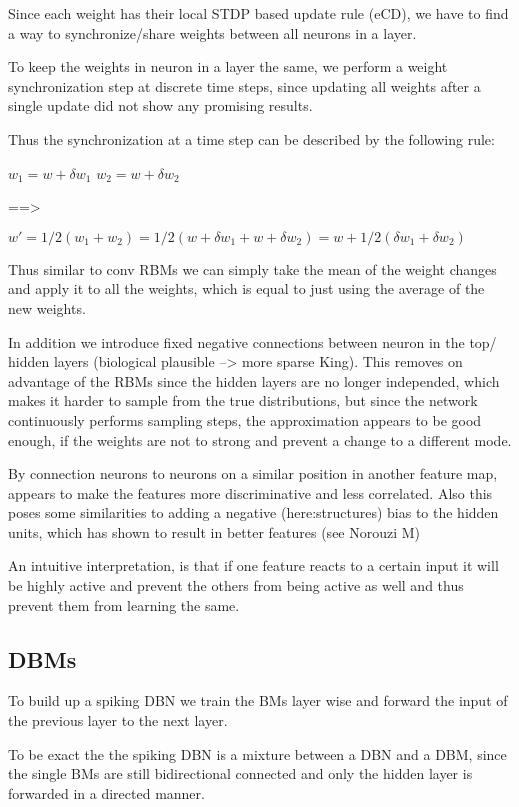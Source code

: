 Since each weight has their local STDP based update rule (eCD), we have to find a way to synchronize/share weights between all neurons in a layer.

To keep the weights in neuron in a layer the same, we perform a weight synchronization step at discrete time steps, since updating all weights after a single update did not show any promising results.

Thus the synchronization at a time step can be described by the following rule:  

$w_1 = w + \delta w_1 $
$w_2 = w + \delta w_2 $

==> 

$w' = 1/2 (w_1 + w_2 ) = 1/2 (w + \delta w_1 + w + \delta w_2) = w + 1/2 (\delta w_1 + \delta w_2)$

Thus similar to conv RBMs we can simply take the mean of the weight changes and apply it to all the weights, which is equal to just using the average of the new weights. 

In addition we introduce fixed negative connections between neuron in the top/ hidden layers (biological plausible --> more sparse King).
This removes on advantage of the RBMs since the hidden layers are no longer independed, which makes it harder to sample from the true distributions, but since the network continuously performs sampling steps, the approximation appears to be good enough, if the weights are not to strong and prevent a change to a different mode.

By connection neurons to neurons on a similar position in another feature map, appears to make the features more discriminative and less correlated.
Also this poses some similarities to adding a negative (here:structures) bias to the hidden units, which has shown to result in better features (see Norouzi M)

An intuitive interpretation, is that if one feature reacts to a certain input it will be highly active and prevent the others from being active as well and thus prevent them from learning the same.  

\subsection{DBMs}

To build up a spiking DBN we train the BMs layer wise and forward the input of the previous layer to the next layer.

To be exact the the spiking DBN is a mixture between a DBN and a DBM, since the single BMs are still bidirectional connected and only the hidden layer is forwarded in a directed manner.

